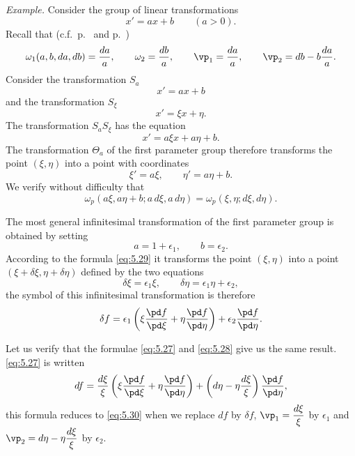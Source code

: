 {\small

\emph{Example.} Consider the group of linear transformations
\[
x'=ax+b\qquad(a>0).
\]
Recall that (c.f.~p.~\pageref{sec:71} and p.~\pageref{sec:74})
\[
\omega_{1}(a,b,da,db)=\frac{da}{a},\qquad\omega_{2}=\frac{db}{a},\qquad\vp_{1}=\frac{da}{a},\qquad\vp_{2}=db-b\frac{da}{a}.
\]
Consider the transformation $S_{a}$
\[
x'=ax+b
\]
and the transformation $S_{\xi}$
\[
x'=\xi x+\eta.
\]
The transformation $S_{a}S_{\xi}$ has the equation
\[
x'=a\xi x+a\eta+b.
\]
The transformation $\Theta_{a}$ of the first parameter group therefore transforms the point $(\xi,\eta)$ into a point with coordinates
\begin{equation}
  \label{eq:5.29}
  \xi'=a\xi,\qquad\eta'=a\eta+b.
\end{equation}
We verify without difficulty that
\[
\omega_{p}(a\xi,a\eta+b;a\,d\xi,a\,d\eta)=\omega_{p}(\xi,\eta;d\xi,d\eta).
\]

The most general infinitesimal transformation of the first parameter group is obtained by setting
\[
a=1+\epsilon_{1},\qquad b=\epsilon_{2}.
\]
According to the formula \eqref{eq:5.29} it transforms the point $(\xi,\eta)$ into a point $(\xi+\delta\xi,\eta+\delta\eta)$ defined by the two equations
\[
\delta\xi=\epsilon_{1}\xi,\qquad\delta\eta=\epsilon_{1}\eta+\epsilon_{2},
\]
the symbol of this infinitesimal transformation is therefore
\begin{equation}
  \label{eq:5.30}
  \delta f=\epsilon_{1}\left(\xi\frac{\pd f}{\pd\xi}+\eta\frac{\pd f}{\pd\eta}\right)+\epsilon_{2}\frac{\pd f}{\pd \eta}.
\end{equation}

Let us verify that the formulae \eqref{eq:5.27} and \eqref{eq:5.28} give us the same result. \eqref{eq:5.27} is written
\[
df=\frac{d\xi}{\xi}\left(\xi\frac{\pd f}{\pd\xi}+\eta\frac{\pd f}{\pd\eta}\right)+\left(d\eta-\eta\frac{d\xi}{\xi}\right)\frac{\pd f}{\pd \eta},
\]
this formula reduces to \eqref{eq:5.30} when we replace $df$ by $\delta f$, $\vp_{1}=\dfrac{d\xi}{\xi}$ by $\epsilon_{1}$ and $\vp_{2}=d\eta-\eta\dfrac{d\xi}{\xi}$ by $\epsilon_{2}$.
}

